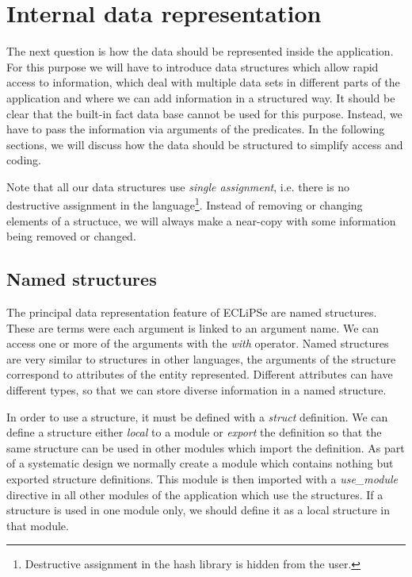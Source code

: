 \documentclass[a4paper,12pt]{report}
\begin{document}
\section{Internal data representation}
The next question is how the data should be represented inside the application. For this purpose we will have to introduce data structures which allow rapid access to information, which deal with multiple data sets in different parts of the application and where we can add information in a structured way. It should be clear that the built-in fact data base cannot be used for this purpose. Instead, we have to pass the information via arguments of the predicates. In the following sections, we will discuss how the data should be structured to simplify access and coding.

Note that all our data structures use {\it single assignment}, i.e. there is no destructive assignment in the language\footnote{Destructive assignment in the hash library is hidden from the user.}. Instead of removing or changing elements of a structuce, we will always make a near-copy with some information being removed or changed. 

\subsection{Named structures}
The principal data representation feature of ECLiPSe are named structures. These are terms were each argument is linked to an argument name. We can access one or more of the arguments with the {\it with} operator. Named structures are very similar to structures in other languages, the arguments of the structure correspond to attributes of the entity represented. Different attributes can have different types, so that we can store diverse information in a named structure.

In order to use a structure, it must be defined with a {\it struct} definition. We can define a structure either {\it local} to a module or {\it export} the definition so that the same structure can be used in other modules which import the definition. As part of a systematic design we normally create a module which contains nothing but exported structure definitions. This module is then imported with a {\it use\_module} directive in all other modules of the application which use the structures. If a structure is used in one module only, we should define it as a local structure in that module.
\end{document}
